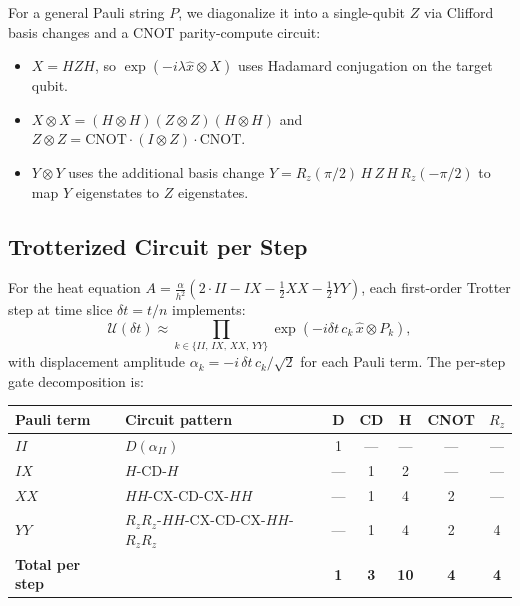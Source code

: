\documentclass[11pt]{article}
\begin{document}
For a general Pauli string $P$, we diagonalize it into a single-qubit $Z$
via Clifford basis changes and a CNOT parity-compute circuit:
\begin{itemize}[itemsep=2pt]
  \item $X = H Z H$, so $\exp(-i\lambda\hat{x}\otimes X)$ uses Hadamard
        conjugation on the target qubit.
  \item $X\otimes X = (H\otimes H)(Z\otimes Z)(H\otimes H)$ and
        $Z\otimes Z = \mathrm{CNOT}\cdot(I\otimes Z)\cdot\mathrm{CNOT}$.
  \item $Y\otimes Y$ uses the additional basis change
        $Y = R_z(\pi/2)\,H\,Z\,H\,R_z(-\pi/2)$ to map $Y$ eigenstates
        to $Z$ eigenstates.
\end{itemize}

\subsection{Trotterized Circuit per Step}

For the heat equation $A = \tfrac{\alpha}{h^2}(2\cdot II - IX
- \tfrac{1}{2}XX - \tfrac{1}{2}YY)$, each first-order Trotter step
at time slice $\delta t = t/n$ implements:
\begin{equation}
  \mathcal{U}(\delta t)
  \approx
  \prod_{k \in \{II,\, IX,\, XX,\, YY\}}
  \exp\!\left(-i\delta t\, c_k\, \hat{x} \otimes P_k\right),
\end{equation}
with displacement amplitude $\alpha_k = -i\,\delta t\, c_k / \sqrt{2}$
for each Pauli term.  The per-step gate decomposition is:

\begin{center}
\begin{tabular}{llccccc}
  \toprule
  Pauli term & Circuit pattern & D & CD & H & CNOT & $R_z$ \\
  \midrule
  $II$ & $D(\alpha_{II})$ & 1 & --- & --- & --- & --- \\
  $IX$ & $H$-$\mathrm{CD}$-$H$ & --- & 1 & 2 & --- & --- \\
  $XX$ & $HH$-$\mathrm{CX}$-$\mathrm{CD}$-$\mathrm{CX}$-$HH$ & --- & 1 & 4 & 2 & --- \\
  $YY$ & $R_z R_z$-$HH$-$\mathrm{CX}$-$\mathrm{CD}$-$\mathrm{CX}$-$HH$-$R_z R_z$
       & --- & 1 & 4 & 2 & 4 \\
  \midrule
  \textbf{Total per step} & & \textbf{1} & \textbf{3} & \textbf{10}
  & \textbf{4} & \textbf{4} \\
  \bottomrule
\end{tabular}
\end{center}
\end{document}
